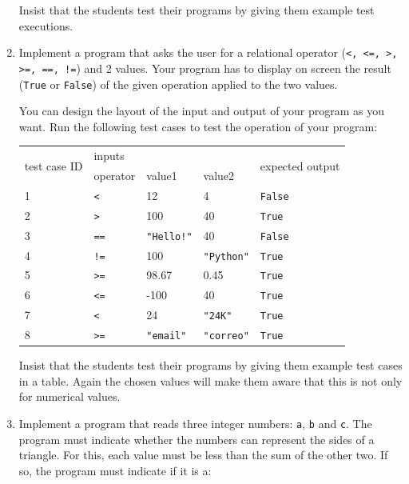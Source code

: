 \documentclass[
  fontsize=10pt,
  a4paper,
]{scrartcl}
\newenvironment{howTILEd}%
  {\begin{mdframed}[skipabove=10pt,skipbelow=10pt,backgroundcolor=pink!40]}%
  {\end{mdframed}}
\begin{document}
\begin{enumerate}
\begin{howTILEd}
Insist that the students test their programs by giving them example test executions. 
\end{howTILEd}


\item Implement a program that asks the user for a relational operator (\verb|<, <=, >, >=, ==, !=|) and 2 values. Your program has to display on screen the result (\verb+True+ or \verb+False+) of the given operation applied to the two values.

You can design the layout of the input and output of your program as you want. Run the following test cases to test the operation of your program:

\begin{tabular}{|l|l|l|l|l|}
\hline
\multirow{2}{*}{test case ID} & \multicolumn{3}{l|}{inputs} & \multirow{2}{*}{expected output}   \\ \cline{2-4} 
             & operator & value1 & value2 &  \\
\hline\hline
1 & \verb+<+ & 12 & 4 & \verb+False+ \\
2 & \verb+>+ & 100 & 40 & \verb+True+ \\
3 & \verb+==+ & \verb+"Hello!"+ & 40 & \verb+False+ \\
4 & \verb+!=+ & 100 & \verb+"Python"+ & \verb+True+ \\
5 & \verb+>=+ & 98.67 & 0.45 & \verb+True+ \\
6 & \verb+<=+ & -100 & 40 & \verb+True+ \\
7 & \verb+<+ & 24 & \verb+"24K"+ & \verb+True+ \\
8 & \verb+>=+ & \verb+"email"+ & \verb+"correo"+ & \verb+True+ \\
\hline
\end{tabular}

\begin{howTILEd}
Insist that the students test their programs by giving them example test cases in a table. Again the chosen values will make them aware that this is not only for numerical values.
\end{howTILEd}



\item Implement a program that reads three integer numbers:
\verb+a+, \verb+b+ and \verb+c+. The program must indicate whether the numbers can represent the sides of a triangle. For this, each value must be less than the sum of the other two. If so, the program must indicate if it is a:


\end{enumerate}
\end{document}
